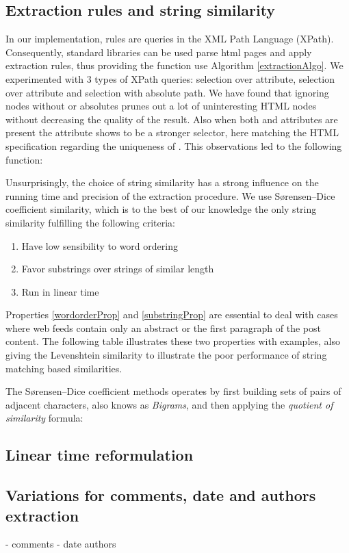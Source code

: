 \subsection{Extraction rules and string similarity}
In our implementation, rules are queries in the XML Path Language (XPath). Consequently, standard libraries can be used parse html pages and apply extraction rules, thus providing the  function use Algorithm \ref{extractionAlgo}. We experimented with 3 types of XPath queries: selection over  attribute, selection over  attribute and selection with absolute path. We have found that ignoring nodes without  or  absolutes prunes out a lot of uninteresting HTML nodes without decreasing  the quality of the result. Also when both  and  attributes are present the  attribute shows to be a stronger selector, here matching the HTML specification regarding the uniqueness of . This observations led to the following \code{\ref{allrulesAlgo}} function:

\allrulesAlgo

Unsurprisingly, the choice of string similarity has a strong influence on the running time and precision of the extraction procedure. We use Sørensen–Dice coefficient similarity\cite{dice1945}, which is to the best of our knowledge the only string similarity fulfilling the following criteria:

\begin{enumerate}
  \item \label{wordorderProp} Have low sensibility to word ordering
  \item \label{substringProp} Favor substrings over strings of similar length
  \item \label{lineraProp} Run in linear time
\end{enumerate}

Properties \ref{wordorderProp} and \ref{substringProp} are essential to deal with cases where web feeds contain only an abstract or the first paragraph of the post content. The following table illustrates these two properties with examples, also giving the Levenshtein\cite{levenshtein1966} similarity to illustrate the poor performance of string matching based similarities.

\similarityTable

The Sørensen–Dice coefficient methods operates by first building sets of pairs of adjacent characters, also knows as \emph{Bigrams}, and then applying the \emph{quotient of similarity} formula:

\similarityAlgo

\subsection{Linear time reformulation}



\subsection{Variations for comments, date and authors extraction}
- comments
- date authors
